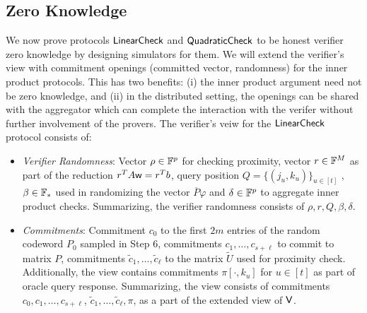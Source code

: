 \subsection{Zero Knowledge}
We now prove protocols $\mathsf{LinearCheck}$ and $\mathsf{QuadraticCheck}$ to be honest verifier
zero knowledge by designing simulators for them. We will extend the verifier's
view with commitment openings (committed vector, randomness) for the inner
product protocols. This has two benefits: (i) the inner product argument need
not be zero knowledge, and (ii) in the distributed setting, the openings can be
shared with the aggregator which can complete the interaction with the verifer
without further involvement of the provers. The verifier's veiw for
the $\mathsf{LinearCheck}$ protocol consists of:
\begin{itemize}[\leftmargin=0pt]
\item {\em Verifier Randomness}: Vector $\rho \in \mathbb{F}^p$ for checking proximity,
vector $r\in \mathbb{F}^M$ as part of the reduction $r^TA\mathsf{w}=r^Tb$, query position $Q=
\{(j_u,k_u)\}_{u\in [t]}$ ,$\beta\in \mathbb{F}_\ast$ used in randomizing the vector
$\overline{P}\varphi$ and $\delta \in \mathbb{F}^p$ to aggregate inner product checks.
Summarizing, the verifier randomness consists of $\rho, r, Q, \beta, \delta$. %

\item {\em Commitments}: Commitment $c_0$ to the first $2m$ entries of the
random codeword $P_0$ sampled in Step 6, commitments $c_1,\ldots,c_{s+\ell}$ to
commit to matrix $P$, commitments $\tilde{c}_1,\ldots,\tilde{c}_{\ell}$ to the
matrix $\tilde{U}$ used for proximity check. 
Additionally, the view contains commitments $\pi[\cdot,k_u]$ for $u\in [t]$ as part of oracle query response. Summarizing, the view consists of commitments $c_0,c_1,\ldots,c_{s+\ell}$, $\tilde{c}_1, \ldots, \tilde{c}_{\ell} , \pi$, as a part of the extended view of $\mathsf{V}$.%


\end{itemize}
